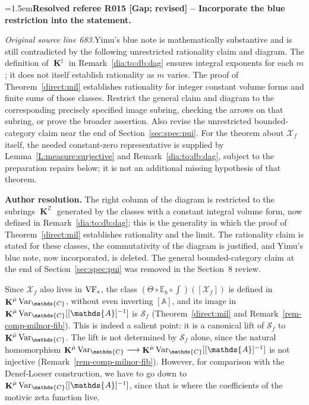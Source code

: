 \documentclass[12pt]{amsart}
\newcommand{\ResolvedRefereeRemark}[5]{%
  \par\medskip\begingroup\normalfont\small\color{gray}%
  \emergencystretch=1.5em\noindent\textbf{Resolved referee R#1 [#2] -- #3.}\par\nobreak\noindent #4\par
  \medskip\color{ResolutionGreen}\noindent\textbf{Author resolution.} #5\par
  \endgroup\medskip
}
\theoremstyle{plain}
\theoremstyle{definition}
\theoremstyle{remark}
\numberwithin{equation}{section}
\theoremstyle{plain}
\newcommand{\VF}{\textup{VF}}
\newcommand{\Z}{\mathds{Z}}
\newcommand{\A}{\mathds{A}}
\newcommand{\C}{\mathds{C}}
\newcommand{\0}{\emptyset}
\newcommand{\mdl}[1]{\mathcal{#1}}  %
\newcommand{\bb}[1]{\mathbb{#1}}
\newcommand{\fun}{\longrightarrow}
\DeclareMathOperator{\ggk}{\mathbf{K}}
\newcommand{\var}{\textup{Var}}
\newcommand{\gmv}{\ggk^{\hat \mu}\var_{\C}}
\begin{document}
\ResolvedRefereeRemark{015}{Gap; revised}{Incorporate the blue restriction into the statement}{%
\textit{Original source line 683.}\quad Yimu's blue note is mathematically substantive and is still contradicted by the following unrestricted rationality claim and diagram. The definition of $\ggk^{\natural}$ in Remark~\ref{dia:to:db:dag} ensures integral exponents for each $m$; it does not itself establish rationality as $m$ varies. The proof of Theorem~\ref{direct:mil} establishes rationality for integer constant volume forms and finite sums of those classes. Restrict the general claim and diagram to the corresponding precisely specified image subring, checking the arrows on that subring, or prove the broader assertion. Also revise the unrestricted bounded-category claim near the end of Section~\ref{sec:spec:pui}. For the theorem about $\mdl X_f$ itself, the needed constant-zero representative is supplied by Lemma~\ref{L:measure:surjective} and Remark~\ref{dia:to:db:dag}, subject to the preparation repairs below; it is not an additional missing hypothesis of that theorem.
}{The right column of the diagram is restricted to the subrings $\ggk^{\Z}$ generated by the classes with a constant integral volume form, now defined in Remark~\ref{dia:to:db:dag}; this is the generality in which the proof of Theorem~\ref{direct:mil} establishes rationality and the limit. The rationality claim is stated for these classes, the commutativity of the diagram is justified, and Yimu's blue note, now incorporated, is deleted. The general bounded-category claim at the end of Section~\ref{sec:spec:pui} was removed in the Section~8 review.}

Since $\mdl X_f$ also lives in $\VF_*$, the class $(\Theta \circ \bb E_b \circ \int)([\mdl X_f])$ is defined in $\gmv$, without even inverting $[\A]$, and its image in $\gmv[[\A]^{-1}]$ is $\mathscr S_{f}$ (Theorem~\ref{direct:mil} and Remark~\ref{rem-comp-milnor-fib}). This is indeed a salient point: it is a canonical lift of $\mathscr S_{f}$ to $\gmv$. The lift is not determined by $\mathscr S_f$ alone, since the natural homomorphism $\gmv \fun \gmv[[\A]^{-1}]$ is not injective (Remark~\ref{rem-comp-milnor-fib}). However, for comparison with the Denef-Loeser construction, we have to go down to  $\gmv[[\A]^{-1}]$, since that is where the coefficients of the motivic zeta function live.
\end{document}
